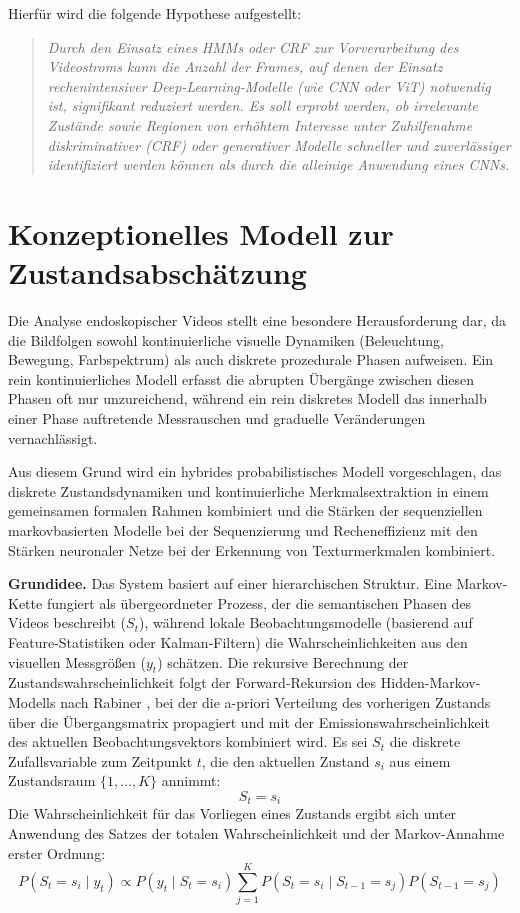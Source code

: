 Hierfür wird die folgende Hypothese aufgestellt: 
\begin{quote}
\textit{Durch den Einsatz eines HMMs  oder CRF  zur Vorverarbeitung des Videostroms kann die Anzahl der Frames, auf denen der Einsatz rechenintensiver Deep-Learning-Modelle (wie CNN oder ViT) notwendig ist, signifikant reduziert werden. Es soll erprobt werden, ob irrelevante Zustände sowie Regionen von erhöhtem Interesse unter Zuhilfenahme diskriminativer (CRF) oder generativer Modelle  schneller und zuverlässiger identifiziert werden können als durch die alleinige Anwendung eines CNNs.}
\end{quote}
\section{Konzeptionelles Modell zur Zustandsabschätzung}

Die Analyse endoskopischer Videos stellt eine besondere Herausforderung dar, da die Bildfolgen sowohl kontinuierliche visuelle Dynamiken (Beleuchtung, Bewegung, Farbspektrum) als auch diskrete prozedurale Phasen aufweisen. Ein rein kontinuierliches Modell erfasst die abrupten Übergänge zwischen diesen Phasen oft nur unzureichend, während ein rein diskretes Modell das innerhalb einer Phase auftretende Messrauschen und graduelle Veränderungen vernachlässigt. 

Aus diesem Grund wird ein hybrides probabilistisches Modell vorgeschlagen, das diskrete Zustandsdynamiken und kontinuierliche Merkmalsextraktion in einem gemeinsamen formalen Rahmen kombiniert und die Stärken der sequenziellen markovbasierten Modelle bei der Sequenzierung und Recheneffizienz mit den Stärken neuronaler Netze bei der Erkennung von Texturmerkmalen kombiniert.

\vspace{0.5em}
\noindent
\textbf{Grundidee.}  
Das System basiert auf einer hierarchischen Struktur. Eine Markov-Kette fungiert als übergeordneter Prozess, der die semantischen Phasen des Videos beschreibt ($S_t$), während lokale Beobachtungsmodelle (basierend auf Feature-Statistiken oder Kalman-Filtern) die Wahrscheinlichkeiten aus den visuellen Messgrößen ($y_t$) schätzen.
Die rekursive Berechnung der Zustandswahrscheinlichkeit folgt der Forward-Rekursion des Hidden-Markov-Modells nach Rabiner \cite{18626}, bei der die a-priori Verteilung des vorherigen Zustands über die Übergangsmatrix propagiert und mit der Emissionswahrscheinlichkeit des aktuellen Beobachtungsvektors kombiniert wird.
Es sei $S_t$ die diskrete Zufallsvariable zum Zeitpunkt $t$, die den aktuellen Zustand $s_i$ aus einem Zustandsraum $\{1, \dots, K\}$ annimmt:
\begin{equation}
S_t = s_i
\end{equation}
Die Wahrscheinlichkeit für das Vorliegen eines Zustands ergibt sich unter Anwendung des Satzes der totalen Wahrscheinlichkeit und der Markov-Annahme erster Ordnung:
\begin{equation}
P(S_t = s_i \mid y_t)
\propto
P(y_t \mid S_t = s_i)\sum_{j=1}^{K} P(S_t = s_i \mid S_{t-1} = s_j) P(S_{t-1} = s_j)
\end{equation}

